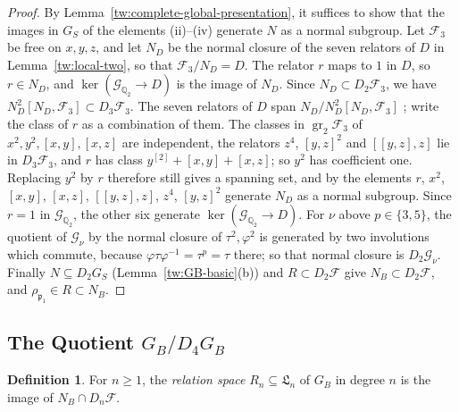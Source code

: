 \documentclass[11pt]{amsart}
\numberwithin{equation}{section}
\theoremstyle{definition}
\newtheorem{definition}[equation]{Definition}
\theoremstyle{remark}
\newcommand{\Q}{\mathbb Q}
\begin{document}
\begin{proof}
By Lemma~\ref{tw:complete-global-presentation}, it suffices to show that the
images in $G_S$ of the elements (ii)--(iv) generate $N$ as a normal
subgroup. Let $\mathcal F_3$ be free on $x,y,z$, and let $N_D$ be the normal
closure of the seven relators of $D$ in Lemma~\ref{tw:local-two}, so that
$\mathcal F_3/N_D=D$. The relator $r$ maps to $1$ in $D$, so $r\in N_D$, and
$\ker(\mathcal G_{\Q_2}\to D)$ is the image of $N_D$. Since
$N_D\subset D_2\mathcal F_3$, we have
$N_D^2[N_D,\mathcal F_3]\subset D_3\mathcal F_3$. The seven relators of $D$
span $N_D/N_D^2[N_D,\mathcal F_3]$
\cite[Corollary~3.9.3]{NeukirchSchmidtWingberg2008}; write the class of $r$ as
a combination of them. The classes in $\operatorname{gr}_2\mathcal F_3$ of
$x^2,y^2,[x,y],[x,z]$ are independent, the relators $z^4$, $[y,z]^2$ and
$[[y,z],z]$ lie in $D_3\mathcal F_3$, and $r$ has class
$y^{[2]}+[x,y]+[x,z]$; so $y^2$ has coefficient one. Replacing $y^2$ by $r$
therefore still gives a spanning set, and by
\cite[Corollary~3.9.3]{NeukirchSchmidtWingberg2008} the elements $r$, $x^2$,
$[x,y]$, $[x,z]$, $[[y,z],z]$, $z^4$, $[y,z]^2$ generate $N_D$ as a normal
subgroup. Since $r=1$ in $\mathcal G_{\Q_2}$, the other six generate
$\ker(\mathcal G_{\Q_2}\to D)$. For $\nu$ above $p\in\{3,5\}$, the quotient
of $\mathcal G_\nu$ by the normal closure of $\tau^2,\varphi^2$ is generated
by two involutions which commute, because
$\varphi\tau\varphi^{-1}=\tau^p=\tau$ there; so that normal closure is
$D_2\mathcal G_\nu$. Finally $N\subseteq D_2G_S$
(Lemma~\ref{tw:GB-basic}(b)) and
$R\subset D_2\mathcal F$ give $N_B\subset D_2\mathcal F$, and
$\rho_{\mathfrak p_1}\in R\subset N_B$.
\end{proof}

\subsection{\texorpdfstring{The Quotient $G_B/D_4G_B$}{The Quotient G\_B/D\_4G\_B}}\label{tw:retained-section}

\begin{definition}\label{tw:relation-space}
For $n\ge1$, the \emph{relation space} $R_n\subseteq\mathfrak L_n$ of $G_B$
in degree $n$ is the image of $N_B\cap D_n\mathcal F$.
\end{definition}
\end{document}
